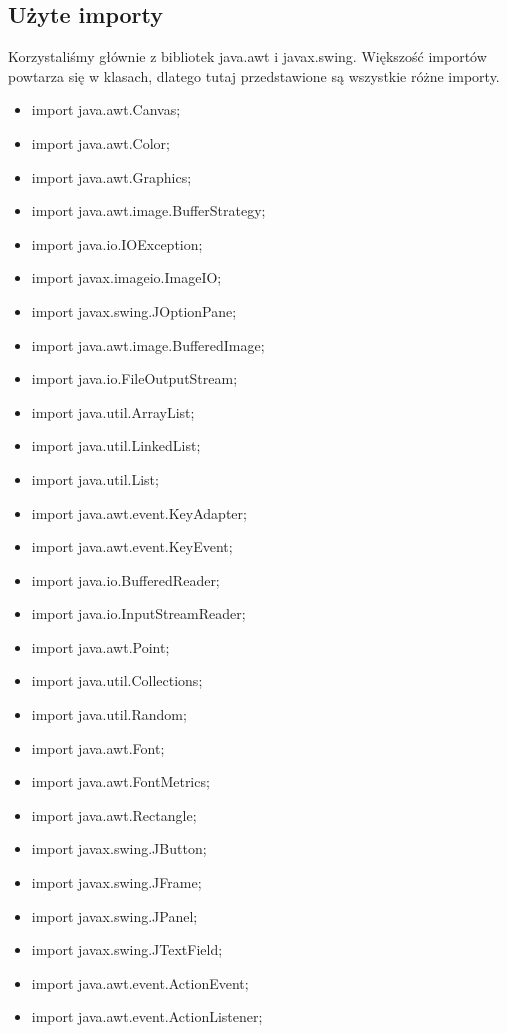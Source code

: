 \documentclass{article}
\begin{document}
\subsection{Użyte importy}
Korzystaliśmy głównie z bibliotek java.awt i javax.swing. Większość importów powtarza się w klasach, dlatego tutaj przedstawione są wszystkie różne importy.
\begin{itemize}
\item import java.awt.Canvas;
\item import java.awt.Color;
\item import java.awt.Graphics;
\item import java.awt.image.BufferStrategy;
\item import java.io.IOException;
\item import javax.imageio.ImageIO;
\item import javax.swing.JOptionPane;
\item import java.awt.image.BufferedImage;
\item import java.io.FileOutputStream;
\item import java.util.ArrayList;
\item import java.util.LinkedList;
\item import java.util.List;
\item import java.awt.event.KeyAdapter;
\item import java.awt.event.KeyEvent;
\item import java.io.BufferedReader;
\item import java.io.InputStreamReader;
\item import java.awt.Point;
\item import java.util.Collections;
\item import java.util.Random;
\item import java.awt.Font;
\item import java.awt.FontMetrics;
\item import java.awt.Rectangle;
\item import javax.swing.JButton;
\item import javax.swing.JFrame;
\item import javax.swing.JPanel;
\item import javax.swing.JTextField;
\item import java.awt.event.ActionEvent;
\item import java.awt.event.ActionListener;
\end{itemize}
\end{document}
